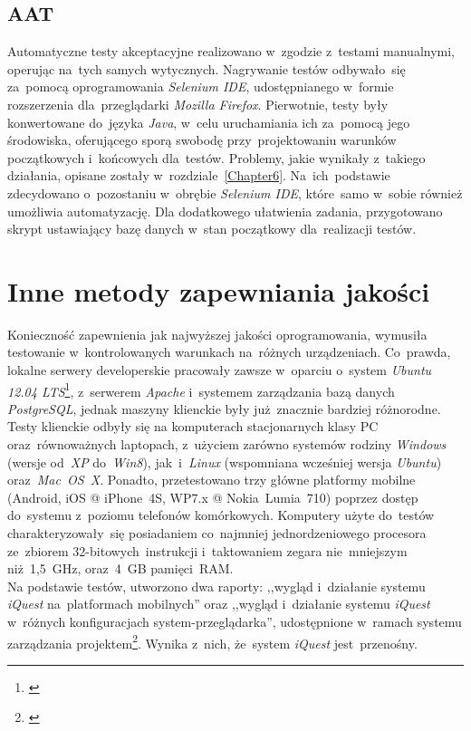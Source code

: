 \subsection{AAT}
\label{Chapter732}

Automatyczne testy akceptacyjne realizowano w~zgodzie z~testami manualnymi, operując na~tych samych wytycznych. Nagrywanie testów odbywało~się za~pomocą oprogramowania \textit{Selenium IDE}, udostępnianego w~formie rozszerzenia dla~przeglądarki \textit{Mozilla Firefox}. Pierwotnie, testy były konwertowane do~języka \textit{Java}, w~celu uruchamiania ich za~pomocą jego środowiska, oferującego sporą swobodę przy~projektowaniu warunków początkowych i~końcowych dla~testów. Problemy, jakie wynikały z~takiego działania, opisane zostały w~rozdziale~\ref{Chapter6}. Na~ich~podstawie zdecydowano o~pozostaniu w~obrębie \textit{Selenium IDE}, które~samo w~sobie również umożliwia automatyzację. Dla dodatkowego ułatwienia zadania, przygotowano skrypt ustawiający bazę danych w~stan początkowy dla~realizacji testów.

\section{Inne metody zapewniania jakości}
\label{Chapter74}

Konieczność zapewnienia jak najwyższej jakości oprogramowania, wymusiła testowanie w~kontrolowanych warunkach na~różnych urządzeniach. Co~prawda, lokalne serwery developerskie pracowały zawsze w~oparciu o~system \textit{Ubuntu 12.04 LTS}\footnote{\cite{Man:Ubuntu}}, z~serwerem \textit{Apache} i~systemem zarządzania bazą danych \textit{PostgreSQL}, jednak maszyny klienckie były już~znacznie bardziej różnorodne. \\

Testy klienckie odbyły się na komputerach stacjonarnych klasy PC oraz~równoważnych laptopach, z~użyciem zarówno systemów rodziny \textit{Windows} (wersje od~\textit{XP} do~\textit{Win8}), jak~i~\textit{Linux} (wspomniana wcześniej wersja \textit{Ubuntu}) oraz~\textit{Mac~OS~X}. Ponadto, przetestowano trzy główne platformy mobilne (Android, iOS @ iPhone~4S, WP7.x @ Nokia~Lumia~710) poprzez dostęp do~systemu z~poziomu telefonów komórkowych. Komputery użyte do~testów charakteryzowały~się posiadaniem co~najmniej jednordzeniowego procesora ze~zbiorem 32-bitowych~instrukcji i~taktowaniem zegara nie~mniejszym niż~1,5~GHz, oraz~4~GB pamięci~RAM. \\

Na podstawie testów, utworzono dwa raporty: ,,wygląd i~działanie systemu \textit{iQuest} na~platformach mobilnych'' oraz ,,wygląd i~działanie systemu \textit{iQuest} w~różnych konfiguracjach system-przeglądarka'', udostępnione w~ramach systemu zarządzania projektem\footnote{\cite{Redmine:ProjDocs}}. Wynika z~nich, że~system \textit{iQuest} jest~przenośny.